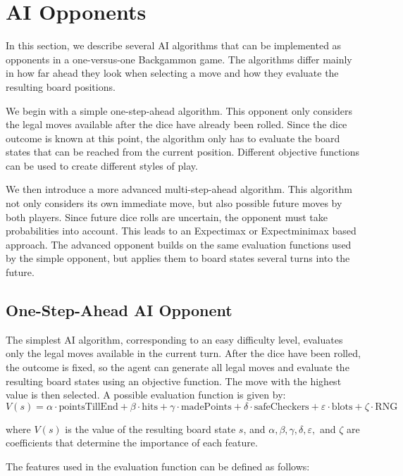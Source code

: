 \documentclass[11pt]{article}
\begin{document}
\section{AI Opponents}
In this section, we describe several AI algorithms that can be implemented as opponents in a one-versus-one Backgammon game. The algorithms differ mainly in how far ahead they look when selecting a move and how they evaluate the resulting board positions.

We begin with a simple one-step-ahead algorithm. This opponent only considers the legal moves available after the dice have already been rolled. Since the dice outcome is known at this point, the algorithm only has to evaluate the board states that can be reached from the current position. Different objective functions can be used to create different styles of play.

We then introduce a more advanced multi-step-ahead algorithm. This algorithm not only considers its own immediate move, but also possible future moves by both players. Since future dice rolls are uncertain, the opponent must take probabilities into account. This leads to an Expectimax or Expectminimax based approach. The advanced opponent builds on the same evaluation functions used by the simple opponent, but applies them to board states several turns into the future.

\subsection{One-Step-Ahead AI Opponent}
The simplest AI algorithm, corresponding to an easy difficulty level, evaluates only the legal moves available in the current turn. After the dice have been rolled, the outcome is fixed, so the agent can generate all legal moves and evaluate the resulting board states using an objective function. The move with the highest value is then selected. A possible evaluation function is given by:
\[
V(s) =
\alpha \cdot \text{pointsTillEnd}
+ \beta \cdot \text{hits}
+ \gamma \cdot \text{madePoints}
+ \delta \cdot \text{safeCheckers}
+ \varepsilon \cdot \text{blots}
+ \zeta \cdot \text{RNG}
\]

where \(V(s)\) is the value of the resulting board state \(s\), and \(\alpha, \beta, \gamma, \delta, \varepsilon,\) and \(\zeta\) are coefficients that determine the importance of each feature.

The features used in the evaluation function can be defined as follows:
\end{document}
